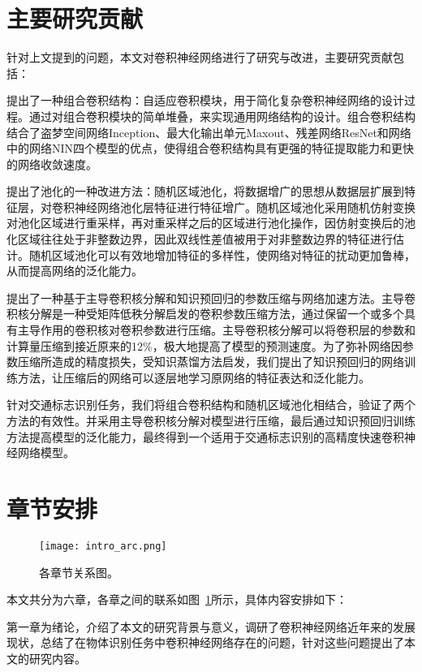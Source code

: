 \section{主要研究贡献}

针对上文提到的问题，本文对卷积神经网络进行了研究与改进，主要研究贡献包括：

提出了一种组合卷积结构：自适应卷积模块，用于简化复杂卷积神经网络的设计过程。通过对组合卷积模块的简单堆叠，来实现通用网络结构的设计。组合卷积结构结合了盗梦空间网络Inception、最大化输出单元Maxout、残差网络ResNet和网络中的网络NIN四个模型的优点，使得组合卷积结构具有更强的特征提取能力和更快的网络收敛速度。

提出了池化的一种改进方法：随机区域池化，将数据增广的思想从数据层扩展到特征层，对卷积神经网络池化层特征进行特征增广。随机区域池化采用随机仿射变换对池化区域进行重采样，再对重采样之后的区域进行池化操作，因仿射变换后的池化区域往往处于非整数边界，因此双线性差值被用于对非整数边界的特征进行估计。随机区域池化可以有效地增加特征的多样性，使网络对特征的扰动更加鲁棒，从而提高网络的泛化能力。

提出了一种基于主导卷积核分解和知识预回归的参数压缩与网络加速方法。主导卷积核分解是一种受矩阵低秩分解启发的卷积参数压缩方法，通过保留一个或多个具有主导作用的卷积核对卷积参数进行压缩。主导卷积核分解可以将卷积层的参数和计算量压缩到接近原来的12\%，极大地提高了模型的预测速度。为了弥补网络因参数压缩所造成的精度损失，受知识蒸馏方法启发，我们提出了知识预回归的网络训练方法，让压缩后的网络可以逐层地学习原网络的特征表达和泛化能力。

针对交通标志识别任务，我们将组合卷积结构和随机区域池化相结合，验证了两个方法的有效性。并采用主导卷积核分解对模型进行压缩，最后通过知识预回归训练方法提高模型的泛化能力，最终得到一个适用于交通标志识别的高精度快速卷积神经网络模型。

\section{章节安排}


\begin{figure}[h]
\centering
\texttt{[image: intro\_arc.png]}
\caption{各章节关系图。}
\label{fig:intro_arc}
\end{figure}

本文共分为六章，各章之间的联系如图~\ref{fig:intro_arc}所示，具体内容安排如下：

第一章为绪论，介绍了本文的研究背景与意义，调研了卷积神经网络近年来的发展现状，总结了在物体识别任务中卷积神经网络存在的问题，针对这些问题提出了本文的研究内容。

